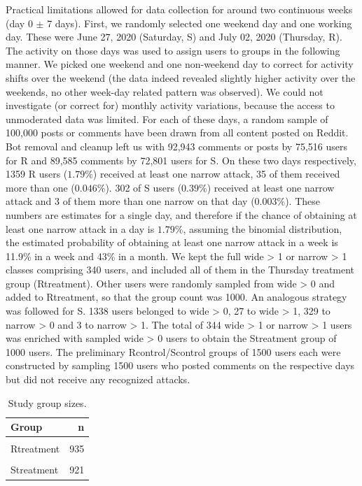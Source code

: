 \documentclass[10pt,dvipsnames]{scrartcl}
\begin{document}
Practical limitations allowed for data collection for around two
continuous weeks (day 0 \(\pm\) 7 days). First, we randomly selected one
weekend day and one working day. These were June 27, 2020 (Saturday,
\textsf{S}) and July 02, 2020 (Thursday, \textsf{R}). The activity on
those days was used to assign users to groups in the following manner.
We picked one weekend and one non-weekend day to correct for activity
shifts over the weekend (the data indeed revealed slightly higher
activity over the weekends, no other week-day related pattern was
observed). We could not investigate (or correct for) monthly activity
variations, because the access to unmoderated data was limited. For each
of these days, a random sample of 100,000 posts or comments have been
drawn from all content posted on \textsf{Reddit}. Bot removal and
cleanup left us with 92,943 comments or posts by 75,516 users for
\textsf{R} and 89,585 comments by 72,801 users for \textsf{S}. On these
two days respectively, 1359 \textsf{R} users (\(1.79\%\)) received at
least one \textsf{narrow} attack, 35 of them received more than one
(\(0.046\%\)). 302 of \textsf{S} users (\(0.39\%\)) received at least
one \textsf{narrow} attack and 3 of them more than one \textsf{narrow}
on that day (\(0.003\%\)). These numbers are estimates for a single day,
and therefore if the chance of obtaining at least one \textsf{narrow}
attack in a day is \(1.79\%\), assuming the binomial distribution, the
estimated probability of obtaining at least one \textsf{narrow} attack
in a week is 11.9\% in a week and 43\% in a month. We kept the full
\textsf{wide > 1} or \textsf{narrow > 1} classes comprising 340 users,
and included all of them in the Thursday treatment group
(\textsf{Rtreatment}). Other users were randomly sampled from
\textsf{wide > 0} and added to \textsf{Rtreatment}, so that the group
count was 1000. An analogous strategy was followed for \textsf{S}. 1338
users belonged to \textsf{wide > 0}, 27 to \textsf{wide > 1}, 329 to
\textsf{narrow > 0} and 3 to \textsf{narrow > 1}. The total of 344
\textsf{wide > 1} or \textsf{narrow > 1} users was enriched with sampled
\textsf{wide > 0} users to obtain the \textsf{Streatment} group of 1000
users. The preliminary \textsf{Rcontrol}/\textsf{Scontrol} groups of
1500 users each were constructed by sampling 1500 users who posted
comments on the respective days but did not receive any recognized
attacks.

\begin{table}[H]
\footnotesize
\begin{table}[H]
\centering\begingroup\fontsize{9}{11}\selectfont

\begin{tabular}{lr}
\toprule
Group & n\\
\midrule
\cellcolor{gray!6}{Rcontrol} & \cellcolor{gray!6}{875}\\
Rtreatment & 935\\
\cellcolor{gray!6}{Scontrol} & \cellcolor{gray!6}{942}\\
Streatment & 921\\
\bottomrule
\end{tabular}
\endgroup{}
\end{table}
\caption{Study group sizes.}
\label{tab:groups}
\end{table}
\end{document}
